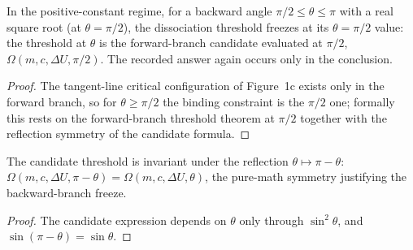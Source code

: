 \begin{theorem}
\label{thm:IPhO2026Problems_problem_IPhO_2026_1_C_1:minimum_angular_frequency_backward_branch_T1_C1}
In the positive-constant regime, for a backward angle
$\pi/2 \le \theta \le \pi$ with a real square root (at $\theta = \pi/2$),
the dissociation threshold freezes at its $\theta = \pi/2$ value: the
threshold at $\theta$ is the forward-branch candidate evaluated at
$\pi/2$, $\Omega(m, c, \Delta U, \pi/2)$.  The recorded answer again
occurs only in the conclusion.
\end{theorem}
\begin{proof}
The tangent-line critical configuration of Figure~1c exists only in the
forward branch, so for $\theta \ge \pi/2$ the binding constraint is the
$\pi/2$ one; formally this rests on the forward-branch threshold theorem
at $\pi/2$ together with the reflection symmetry of the candidate formula.
\end{proof}

\begin{theorem}
\label{thm:IPhO2026Problems_problem_IPhO_2026_1_C_1:hbarOmegaMin_pi_sub}
The candidate threshold is invariant under the reflection
$\theta \mapsto \pi - \theta$:
$\Omega(m, c, \Delta U, \pi - \theta) = \Omega(m, c, \Delta U, \theta)$,
the pure-math symmetry justifying the backward-branch freeze.
\end{theorem}
\begin{proof}
The candidate expression depends on $\theta$ only through $\sin^2\theta$,
and $\sin(\pi - \theta) = \sin\theta$.
\end{proof}
